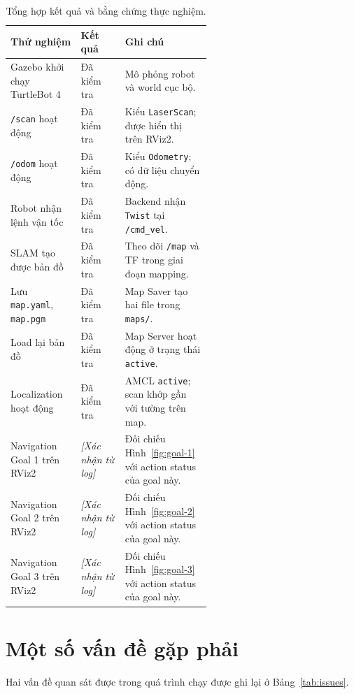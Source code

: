 \documentclass[12pt,a4paper]{article}
\begin{document}
\begin{table}[htbp]
  \centering
  \caption{Tổng hợp kết quả và bằng chứng thực nghiệm.}
  \label{tab:results}
  \small
  \renewcommand{\arraystretch}{1.14}
  \begin{tabularx}{\linewidth}{@{}p{0.35\linewidth}p{0.22\linewidth}X@{}}
    \toprule
    \textbf{Thử nghiệm} & \textbf{Kết quả} & \textbf{Ghi chú} \\
    \midrule
    Gazebo khởi chạy TurtleBot 4 & Đã kiểm tra & Mô phỏng robot và world cục bộ. \\
    \texttt{/scan} hoạt động & Đã kiểm tra & Kiểu \texttt{LaserScan}; được hiển thị trên RViz2. \\
    \texttt{/odom} hoạt động & Đã kiểm tra & Kiểu \texttt{Odometry}; có dữ liệu chuyển động. \\
    Robot nhận lệnh vận tốc & Đã kiểm tra & Backend nhận \texttt{Twist} tại \texttt{/cmd\_vel}. \\
    SLAM tạo được bản đồ & Đã kiểm tra & Theo dõi \texttt{/map} và TF trong giai đoạn mapping. \\
    Lưu \texttt{map.yaml}, \texttt{map.pgm} & Đã kiểm tra & Map Saver tạo hai file trong \texttt{maps/}. \\
    Load lại bản đồ & Đã kiểm tra & Map Server hoạt động ở trạng thái \texttt{active}. \\
    Localization hoạt động & Đã kiểm tra & AMCL \texttt{active}; scan khớp gần với tường trên map. \\
    Navigation Goal 1 trên RViz2 & \textit{[Xác nhận từ log]} & Đối chiếu Hình~\ref{fig:goal-1} với action status của goal này. \\
    Navigation Goal 2 trên RViz2 & \textit{[Xác nhận từ log]} & Đối chiếu Hình~\ref{fig:goal-2} với action status của goal này. \\
    Navigation Goal 3 trên RViz2 & \textit{[Xác nhận từ log]} & Đối chiếu Hình~\ref{fig:goal-3} với action status của goal này. \\
    \bottomrule
  \end{tabularx}
\end{table}

\section{Một số vấn đề gặp phải}

Hai vấn đề quan sát được trong quá trình chạy được ghi lại ở
Bảng~\ref{tab:issues}.
\end{document}
